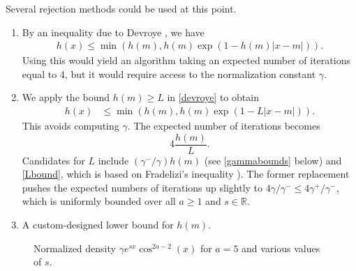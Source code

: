 \documentclass[12pt,reqno,tbtags]{amsart}
\newcommand{\RR}{\mathbb{R}}
\begin{document}
Several rejection methods could be used at this point.
\begin{enumerate}[label=(\roman*)]
\item
By an inequality due to Devroye \cite{D6}, we have
\begin{align}\label{devroye}
h(x) \le \min \left( h(m),  h(m) \exp(1 - h(m)|x-m| ) \right) .
\end{align}
Using this would yield an algorithm taking an expected number of ite\-ra\-tions equal
to 4, but it would require access to the normalization constant $\gamma$.
\item
We apply the bound $h(m) \ge L$ in \eqref{devroye} to obtain
\begin{align}\label{devroye2}
h(x) &\le \min \left( h(m),  h(m) \exp(1 - L|x-m| ) \right).
\end{align}
This avoids computing $\gamma$.  The expected number of iterations
becomes 
$$
4 \frac{h(m)}{L}.
$$
Candidates for $L$ include $(\gamma^-/\gamma) h(m)$ (see \eqref{gammabounds} below) and \eqref{Lbound}, which is based on Fradelizi's inequality \cite{Fradelizi1997}).  The former replacement pushes the expected numbers of iterations up slightly to $4\gamma/ \gamma^- \le 4\gamma^+/\gamma^-$, which is uniformly bounded over all $a \ge 1$ and $s \in \RR$.
\item
A custom-designed lower bound for $h(m)$. 
\end{enumerate}



\bigskip    

\begin{figure}[H]
    \centering
    

\caption{Normalized density $\gamma e^{sx} \cos^{2a-2}(x)$ for $a=5$ and various values of $s$.}
\end{figure}
\end{document}
